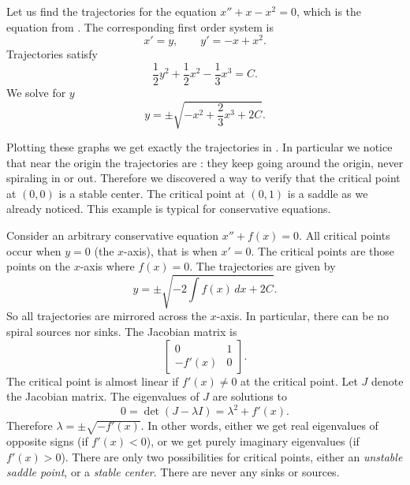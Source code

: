 \begin{example}
Let us find the trajectories for the equation $x'' + x-x^2 = 0$,
which is the equation from
.  The corresponding
first order system is
\begin{equation*}
x' = y , \qquad y' = -x+x^2 .
\end{equation*}
Trajectories satisfy
\begin{equation*}
\frac{1}{2} y^2  + \frac{1}{2} x^2 - \frac{1}{3} x^3  = C .
\end{equation*}
We solve for $y$
\begin{equation*}
y = \pm \sqrt{-x^2 + \frac{2}{3} x^3  + 2C} .
\end{equation*}

Plotting these graphs we get exactly the trajectories in 
.  In particular we notice that near the origin
the trajectories are \emph{}: they keep going
around the origin, never spiraling in or out.  Therefore we discovered a way
to verify that the critical point at $(0,0)$ is a stable center.
The critical point at $(0,1)$ is a saddle as we already noticed.
This example is typical for conservative equations.
\end{example}

Consider an arbitrary
conservative equation $x'' + f(x) = 0$.
All critical points occur when $y=0$ (the
$x$-axis), that is when $x' = 0$.  The critical points are 
those points on the $x$-axis where $f(x) = 0$.
The trajectories are given by
\begin{equation*}
y = \pm \sqrt{ - 2 \int f(x)\, dx + 2C} .
\end{equation*}
So all trajectories are mirrored across the $x$-axis.  In particular,
there can be no spiral sources nor sinks.
The Jacobian matrix is
\begin{equation*}
\begin{bmatrix}
0 & 1 \\
-f'(x) & 0
\end{bmatrix} .
\end{equation*}
The critical point is almost linear if $f'(x) \not= 0$ at the critical 
point.  Let $J$ denote the Jacobian matrix.
The eigenvalues of $J$ are solutions to
\begin{equation*}
0 = \det(J - \lambda I) = \lambda^2 + f'(x) .
\end{equation*}
Therefore $\lambda = \pm \sqrt{-f'(x)}$.  In other words, either we get
real eigenvalues of opposite signs (if $f'(x) < 0$),
or we get purely imaginary eigenvalues (if $f'(x) > 0$).
There are only two possibilities for critical points, either an \emph{unstable
saddle point}, or a \emph{stable center}.
There are never any sinks or sources.

